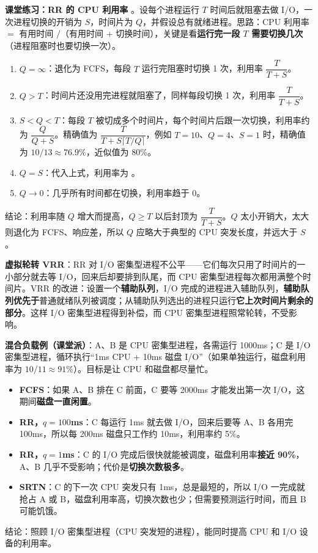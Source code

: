 \textbf{课堂练习：RR 的 CPU 利用率} \bk。设每个进程运行 $T$ 时间后就阻塞去做 I/O，一次进程切换的开销为 $S$，时间片为 $Q$，并假设总有就绪进程。思路：CPU 利用率 $=$ 有用时间 $/$（有用时间 $+$ 切换时间），关键是看\textbf{运行完一段 $T$ 需要切换几次}（进程阻塞时也要切换一次）。
\begin{enumerate}
    \item $Q = \infty$：退化为 FCFS，每段 $T$ 运行完阻塞时切换 1 次，利用率 $\dfrac{T}{T+S}$。
    \item $Q > T$：时间片还没用完进程就阻塞了，同样每段切换 1 次，利用率 $\dfrac{T}{T+S}$。
    \item $S < Q < T$：每段 $T$ 被切成多个时间片，每个时间片后跟一次切换，利用率约为 $\dfrac{Q}{Q+S}$。精确值为 $\dfrac{T}{T+S\lceil T/Q\rceil}$，例如 $T=10$、$Q=4$、$S=1$ 时，精确值为 $10/13 \approx 76.9\%$，近似值为 80\%。
    \item $Q = S$：代入上式，利用率为 。
    \item $Q \to 0$：几乎所有时间都在切换，利用率趋于 0。
\end{enumerate}
结论：利用率随 $Q$ 增大而提高，$Q \ge T$ 以后封顶为 $\dfrac{T}{T+S}$。$Q$ 太小开销大，太大则退化为 FCFS、响应差，所以 $Q$ 应略大于典型的 CPU 突发长度，并远大于 $S$。

\textbf{虚拟轮转 VRR}：RR 对 I/O 密集型进程不公平——它们每次只用了时间片的一小部分就去等 I/O，回来后却要排到队尾，而 CPU 密集型进程每次都用满整个时间片。VRR 的改进：设置一个\textbf{辅助队列}，I/O 完成的进程进入辅助队列，\textbf{辅助队列优先于}普通就绪队列被调度；从辅助队列选出的进程只运行\textbf{它上次时间片剩余的部分}。这样 I/O 密集型进程得到补偿，而 CPU 密集型进程照常轮转，不受影响。

\textbf{混合负载例（课堂派）}：A、B 是 CPU 密集型进程，各需运行 1000ms；C 是 I/O 密集型进程，循环执行“1ms CPU + 10ms 磁盘 I/O”（如果单独运行，磁盘利用率为 $10/11 \approx 91\%$）。目标是让 CPU 和磁盘都尽量忙。
\begin{itemize}
    \item \textbf{FCFS}：如果 A、B 排在 C 前面，C 要等 2000ms 才能发出第一次 I/O，这期间\textbf{磁盘一直闲置}。
    \item \textbf{RR，$q=100$ms}：C 每运行 1ms 就去做 I/O，回来后要等 A、B 各用完 100ms，所以每 200ms 磁盘只工作约 10ms，利用率约 5\%。
    \item \textbf{RR，$q=1$ms}：C 的 I/O 完成后很快就能被调度，磁盘利用率\textbf{接近 90\%}，A、B 几乎不受影响；代价是\textbf{切换次数极多}。
    \item \textbf{SRTN}：C 的下一次 CPU 突发只有 1ms，总是最短的，所以 I/O 一完成就抢占 A 或 B，磁盘利用率高，切换次数也少；但需要预测运行时间，而且 B 可能饥饿。
\end{itemize}
结论：照顾 I/O 密集型进程（CPU 突发短的进程），能同时提高 CPU 和 I/O 设备的利用率。

